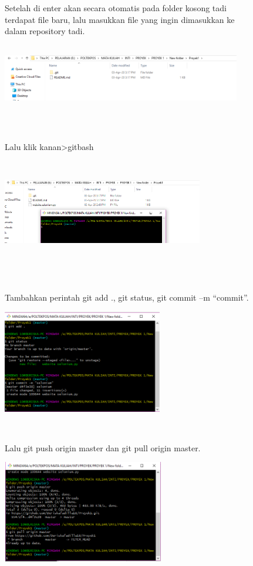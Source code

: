\documentclass{book}
\begin{document}
\begin{enumerate}
\begin{figure} [ht]
    \end{figure} \begin{figure}
    \item Setelah di enter akan secara otomatis pada folder kosong tadi terdapat file baru, lalu masukkan file yang ingin dimasukkan ke dalam repository tadi.\\
    \centerline{\includegraphics [width=10.45cm, height=2.94cm]{figures/5.4.png}}\\
    \item Lalu klik kanan>gitbash\\
    \centerline{\includegraphics [width=8.78cm, height=4.5cm]{figures/5.5.png}}\\
    \item Tambahkan perintah git add ., git status, git commit –m “commit”.\\
    \centerline{\includegraphics [width=7.01 cm, height=4.5cm]{figures/5.6.png}}\\
    \end{figure} \begin{figure}
    \item Lalu git push origin master dan git pull origin master.\\
    \centerline{\includegraphics [width=7.09cm, height=4.47cm]{figures/5.7.png}}\\

\end{figure}
\end{enumerate}
\end{document}
